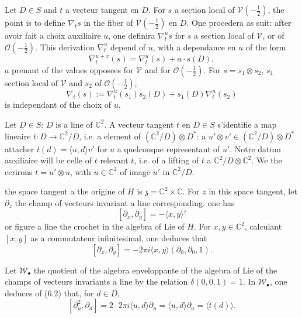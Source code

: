 \documentclass[12pt,a4paper]{article}
\theoremstyle{plain}
\theoremstyle{definition}
\theoremstyle{remark}
\begin{document}
Let $D \in S$ and $t$ a vecteur tangent en $D$. For $s$ a section local of $\mathscr{V}(-\frac{1}{2})$, the point is to define $\nabla_t s$ in the fiber of $\mathscr{V}(-\frac{1}{2})$ en $D$. One procedera as suit: after avoir fait a choix auxiliaire $u$, one definira $\nabla_t^u s$ for $s$ a section local of $\mathscr{V}$, or of $\mathcal{O}(-\frac{1}{2})$. This derivation $\nabla_t^u$ depend of $u$, with a dependance en $u$ of the form
\[\nabla_t^{u+x}(s) = \nabla_t^u(s) + a \cdot s(D),\]
$a$ prenant of the values opposees for $\mathscr{V}$ and for $\mathcal{O}(-\frac{1}{2})$. For $s = s_1 \otimes s_2$, $s_1$ section local of $\mathscr{V}$ and $s_2$ of $\mathcal{O}(-\frac{1}{2})$,
\[\nabla_t(s) := \nabla_t^u(s_1)s_2(D) + s_1(D)\nabla_t^u(s_2)\]
is independant of the choix of $u$.

Let $D \in S$: $D$ is a line of $\mathbb{C}^2$. A vecteur tangent $t$ en $D \in S$ s'identifie a map lineaire $t \colon D \to \mathbb{C}^2/D$, i.e. a element of $(\mathbb{C}^2/D) \otimes D^*$: a $u' \otimes v' \in (\mathbb{C}^2/D) \otimes D^*$ attacher $t(d) = \langle u, d \rangle v'$ for $u$ a quelconque representant of $u'$. Notre datum auxiliaire will be celle of $t$ relevant $t$, i.e. of a lifting of $t$ a $\mathbb{C}^2/D \otimes \mathbb{C}^2$. We the ecrirons $t = u' \otimes u$, with $u \in \mathbb{C}^2$ of image $u'$ in $\mathbb{C}^2/D$.

the space tangent a the origine of $H$ is $\mathfrak{z} = \mathbb{C}^2 \times \mathbb{C}$. For $z$ in this space tangent, let $\partial_z$ the champ of vecteurs invariant a line corresponding. one has
\[[\partial_x, \partial_y] = -\langle x, y \rangle'\]
or figure a line the crochet in the algebra of Lie of $H$. For $x, y \in \mathbb{C}^2$, calculant $[x, y]$ as a commutateur infinitesimal, one deduces that
\begin{equation}\label{eq:6.2}
[\partial_x, \partial_y] = -2\pi i\langle x, y \rangle(\partial_0, \partial_0, 1).\tag{6.2}
\end{equation}

Let $\mathscr{W}_\bullet$ the quotient of the algebra enveloppante of the algebra of Lie of the champs of vecteurs invariants a line by the relation $\delta(0, 0, 1) = 1$. In $\mathscr{W}_\bullet$, one deduces of (6.2) that, for $d \in D$,
\begin{equation}\label{eq:6.3}
[\partial_u^2, \partial_d] = 2 \cdot 2\pi i\langle u, d \rangle \partial_u = \langle u, d \rangle \partial_u = \langle \bar{t}(d) \rangle.\tag{6.3}
\end{equation}
\end{document}
